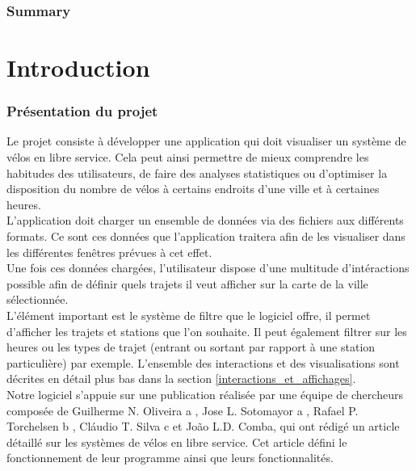 \documentclass[12pt]{article}
\begin{document}
\section*{Summary}


\newpage
\tableofcontents

\newpage
\listoffigures
	
\newpage
\part{Introduction}
	
	\section{Présentation du projet} \label{introduction}
	Le projet consiste à développer une application qui doit visualiser
	un système de vélos en libre service. Cela peut ainsi permettre de mieux comprendre les habitudes
	des utilisateurs, de faire des analyses statistiques ou d'optimiser la disposition du nombre de
	vélos à certains endroits d'une ville et à certaines heures.\\

	L’application doit charger un ensemble de données via des fichiers aux différents formats. Ce sont ces données que l'application traitera afin de les visualiser dans les différentes fenêtres prévues à cet effet.\\
	
	Une fois ces données chargées, l'utilisateur dispose d'une multitude d'intéractions
	possible afin de définir quels trajets il veut afficher sur la carte de la ville sélectionnée.\\		
	L'élément important est le système de filtre que le logiciel offre, il permet d'afficher
	les trajets et stations que l’on souhaite. Il peut également filtrer sur les heures ou
	les types de trajet (entrant ou sortant par rapport à une station particulière) par exemple. L'ensemble des interactions et des visualisations sont décrites en détail plus bas
	dans la section	\ref{interactions_et_affichages}. \\

	Notre logiciel s'appuie sur une publication réalisée par une équipe de chercheurs composée
	de Guilherme N. Oliveira a , Jose L. Sotomayor a , Rafael P. Torchelsen b , Cláudio T. Silva c
	et 
	João L.D. Comba, qui ont rédigé un article \cite{Oli16} détaillé sur les systèmes de vélos en
	libre service. Cet article défini le fonctionnement de leur programme ainsi que leurs
	fonctionnalités. \\
	
\end{document}
